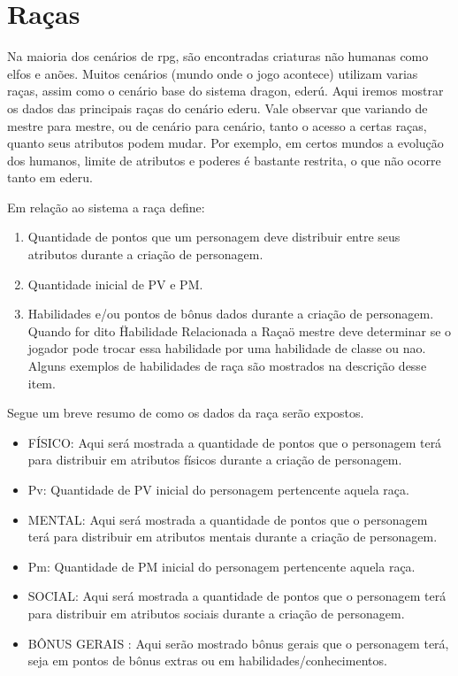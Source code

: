 
\chapter{Raças}
\label{Cap:racas}

Na maioria dos cenários de rpg, são encontradas criaturas não humanas como elfos e anões. Muitos cenários (mundo onde o jogo acontece) utilizam varias raças, assim como o cenário base do sistema dragon, ederú. Aqui iremos mostrar os dados das principais raças do cenário ederu. Vale observar que variando de mestre para mestre, ou de cenário para cenário, tanto o acesso a certas raças, quanto seus atributos podem mudar. Por exemplo, em certos mundos a evolução dos humanos, limite de atributos e poderes é bastante restrita, o que não ocorre tanto em ederu.

Em relação ao sistema a raça define:
\begin{enumerate}
	\item Quantidade de pontos que um personagem deve distribuir entre seus atributos durante a criação de personagem. 
	\item Quantidade inicial de PV e PM.
	\item Habilidades e/ou pontos de bônus dados durante a criação de personagem. Quando for dito \"Habilidade Relacionada a Raça\" o mestre deve determinar se o jogador pode trocar essa habilidade por uma habilidade de classe ou nao. Alguns exemplos de habilidades de raça são mostrados na descrição desse item.
\end{enumerate}


Segue um breve resumo de como os dados da raça serão expostos.

\begin{itemize}

	\item FÍSICO: Aqui será mostrada a quantidade de pontos que o personagem terá para distribuir em atributos físicos durante a criação de personagem.

	\item Pv: Quantidade de PV inicial do personagem pertencente aquela raça.

	\item MENTAL: Aqui será mostrada a quantidade de pontos que o personagem terá para distribuir em atributos mentais durante a criação de personagem.
	\item Pm: Quantidade de PM inicial do personagem pertencente aquela raça.


	\item SOCIAL: Aqui será mostrada a quantidade de pontos que o personagem terá para distribuir em atributos sociais durante a criação de personagem.


	\item BÔNUS GERAIS : Aqui serão mostrado bônus gerais que o personagem terá, seja em pontos de bônus extras ou em habilidades/conhecimentos.
\end{itemize}

